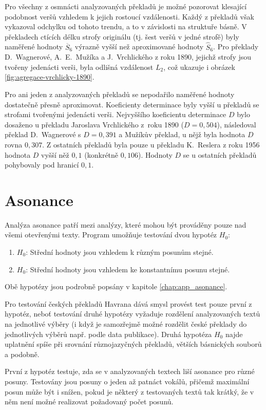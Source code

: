 \documentclass[dp.tex]{subfiles}
\begin{document}
Pro všechny z osmnácti analyzovaných překladů je možné pozorovat klesající podobnost veršů vzhledem k jejich rostoucí vzdálenosti. Každý z překladů však vykazoval odchylku od tohoto trendu, a to v závislosti na struktuře básně. V překladech ctících délku strofy originálu (tj. šest veršů v jedné strofě) byly naměřené hodnoty $\overline{S}_6$ výrazně vyšší než aproximované hodnoty $\hat{S}_6$. Pro překlady D.~Wagnerové, A.~E.~Mužíka a J.~Vrchlického z roku 1890, jejichž strofy jsou tvořeny jedenácti verši, byla odlišná vzdálenost $L_2$, což ukazuje i obrázek \ref{fig:agregace-vrchlicky-1890}.

Pro ani jeden z analyzovaných překladů se nepodařilo naměřené hodnoty dostatečně přesně aproximovat. Koeficienty determinace byly vyšší u překladů se strofami tvořenými jedenácti verši. Nejvyššího koeficientu determinace $D$ bylo dosaženo u překladu Jaroslava Vrchlického z~roku 1890 ($D = 0{,}504$), následoval překlad D.~Wagnerové s $D = 0{,}391$ a Mužíkův překlad, u nějž byla hodnota $D$ rovna $0{,}307$. Z ostatních překladů byla pouze u překladu K.~Reslera z roku 1956 hodnota $D$ vyšší něž $0{,}1$ (konkrétně $0{,}106$). Hodnoty $D$ se u ostatních překladů pohybovaly pod hranicí $0{,}1$.

\section{Asonance}

Analýza asonance patří mezi analýzy, které mohou být prováděny pouze nad všemi otevřenými texty. Program umožňuje testování dvou hypotéz $H_0$:
\begin{enumerate}
\item $H_0$: Střední hodnoty jsou vzhledem k různým posunům stejné.
\item $H_0$: Střední hodnoty jsou vzhledem ke konstantnímu posunu stejné.
\end{enumerate}
Obě hypotézy jsou podrobně popsány v kapitole \ref{chap:app_asonance}.

Pro testování českých překladů Havrana dává smysl provést test pouze první z hypotéz, neboť testování druhé hypotézy vyžaduje rozdělení analyzovaných textů na jednotlivé výběry (i když je samozřejmě možné rozdělit české překlady do jednotlivých výběrů např. podle data publikace). Druhá hypotéza $H_0$ najde uplatnění spíše při srovnání různojazyčných překladů, větších básnických souborů a podobně.

První z hypotéz testuje, zda se v analyzovaných textech liší asonance pro různé posuny. Testovány jsou posuny o jeden až patnáct vokálů, přičemž maximální posun může být i snížen, pokud je některý z testovaných textů tak krátký, že v něm není možné realizovat požadovaný počet posunů.
\end{document}
